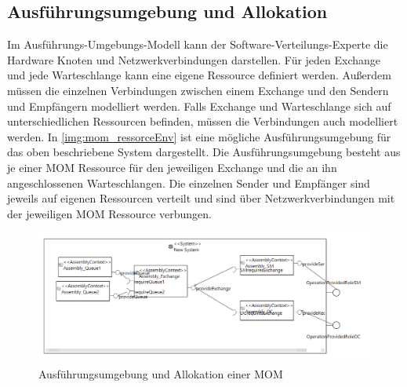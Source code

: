 \subsection{Ausführungsumgebung und Allokation}
Im Ausführungs-Umgebungs-Modell kann der Software-Verteilungs-Experte die Hardware Knoten und Netzwerkverbindungen darstellen. Für jeden Exchange und jede Warteschlange kann eine eigene Ressource definiert werden. Außerdem müssen die einzelnen Verbindungen zwischen einem Exchange und den Sendern und Empfängern modelliert werden. Falls Exchange und Warteschlange sich auf unterschiedlichen Ressourcen befinden, müssen die Verbindungen auch modelliert werden. In \autoref{img:mom_ressorceEnv} ist eine mögliche Ausführungsumgebung für das oben beschriebene System dargestellt. Die Ausführungsumgebung besteht aus je einer MOM Ressource für den jeweiligen Exchange und die an ihn angeschlossenen Warteschlangen. Die einzelnen Sender und Empfänger sind jeweils auf eigenen Ressourcen verteilt und sind über Netzwerkverbindungen mit der jeweiligen MOM Ressource verbungen. 
\begin{figure}
\center
  \includegraphics[width=1\textwidth]{images/mom_system.png}
  \caption{Ausführungsumgebung und Allokation einer MOM}
  \label{img:mom_ressorceEnv}
\end{figure}

